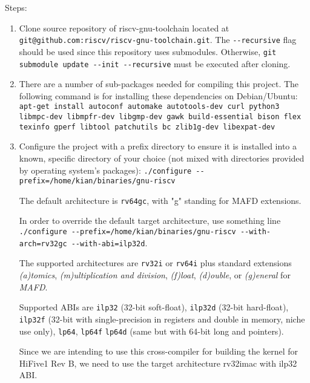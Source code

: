 Steps:
\begin{enumerate}
    \item Clone source repository of riscv-gnu-toolchain located at \lstinline|git@github.com:riscv/riscv-gnu-toolchain.git|. The \lstinline|--recursive| flag should be used since this repository uses submodules. Otherwise, \lstinline|git submodule update --init --recursive| must be executed after cloning.

    \item There are a number of sub-packages needed for compiling this project. The following command is for installing these dependencies on Debian/Ubuntu: \lstinline|apt-get install autoconf automake autotools-dev curl python3 libmpc-dev libmpfr-dev libgmp-dev gawk build-essential bison flex texinfo gperf libtool patchutils bc zlib1g-dev libexpat-dev|

    \item Configure the project with a prefix directory to ensure it is installed into a known, specific directory of your choice (not mixed with directories provided by operating system's packages): \lstinline|./configure --prefix=/home/kian/binaries/gnu-riscv|

    The default architecture is \lstinline|rv64gc|, with "g" standing for MAFD extensions.

    In order to override the default target architecture, use something line \lstinline|./configure --prefix=/home/kian/binaries/gnu-riscv --with-arch=rv32gc --with-abi=ilp32d|.

    The supported architectures are \lstinline|rv32i| or \lstinline|rv64i| plus standard extensions \textit{(a)tomics}, \textit{(m)ultiplication and division}, \textit{(f)loat}, \textit{(d)ouble}, or \textit{(g)eneral} for \textit{MAFD}.

    Supported ABIs are \lstinline|ilp32| (32-bit soft-float), \lstinline|ilp32d| (32-bit hard-float), \lstinline|ilp32f| (32-bit with single-precision in registers and double in memory, niche use only), \lstinline|lp64|, \lstinline|lp64f| \lstinline|lp64d| (same but with 64-bit long and pointers).

    Since we are intending to use this cross-compiler for building the kernel for HiFive1 Rev B, we need to use the target architecture rv32imac with ilp32 ABI.
\end{enumerate}